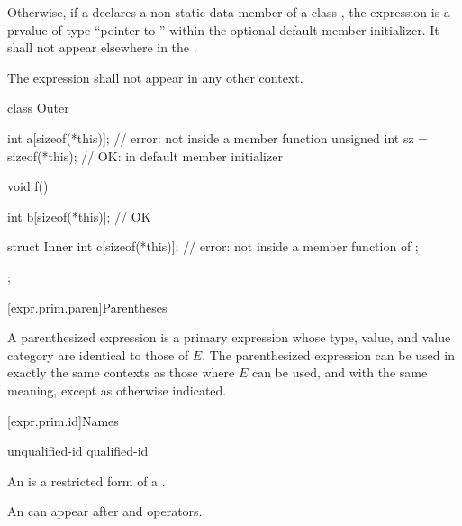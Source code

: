 \pnum
Otherwise, if a  declares a non-static data
member of a class , the expression  is
a prvalue of type ``pointer to '' within the
optional default member initializer. It shall not appear elsewhere
in the .

\pnum
The expression  shall not appear in any other context.
\begin{example}
\begin{codeblock}
class Outer {
  int a[sizeof(*this)];                 // error: not inside a member function
  unsigned int sz = sizeof(*this);      // OK: in default member initializer

  void f() {
    int b[sizeof(*this)];               // OK

    struct Inner {
      int c[sizeof(*this)];             // error: not inside a member function of 
    };
  }
};
\end{codeblock}
\end{example}

[expr.prim.paren]{Parentheses}

\pnum
{}%
A parenthesized expression 
is a primary expression whose type, value, and value category are identical to those of $E$.
The parenthesized expression can be used in exactly the same contexts as
those where $E$ can be used, and with the same
meaning, except as otherwise indicated.

[expr.prim.id]{Names}

\begin{bnf}
\br
    unqualified-id\br
    qualified-id
\end{bnf}

\pnum
{}%
%
An  is a restricted form of a
.
\begin{note}
An  can appear after  and \tcode{->}
operators.
\end{note}


